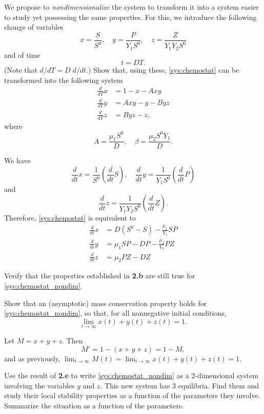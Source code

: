 \documentclass[12pt]{article}
\theoremstyle{plain}
\begin{document}
We propose to \emph{nondimensionalize} the system to transform it into a system easier to study yet possessing the same properties. For this, we introduce the following change of variables
\[
x=\frac{S}{S^0},\quad y=\frac{P}{Y_1S^0},\quad z=\frac{Z}{Y_1Y_2S^0}
\]
and of time
\[
t=DT.
\]
(Note that $d/dT=D\; d/dt$.)
Show that, using these, \eqref{sys:chemostat} can be transformed into the following system
\begin{subequations}\label{sys:chemostat_nondim}
\begin{align}
\frac{d}{dT} x &= 1-x-Axy \label{sys:chemostat_nondim_x} \\
\frac{d}{dT} y &= Axy-y-Byz \label{sys:chemostat_nondim_y} \\
\frac{d}{dT} z &= Byz-z, \label{sys:chemostat_nondim_z}
\end{align}
\end{subequations}
where
\[
A=\frac{\mu_1S^0}{D},\quad \beta=\frac{\mu_2S^0Y_1}{D}.
\]

We have
\[
\frac{d}{dt} x=\frac{1}{S^0}\left(\frac{d}{dt}S\right),\quad
\frac{d}{dt} y=\frac{1}{Y_1S^0}\left(\frac{d}{dt}P\right)
\]
and
\[
\frac{d}{dt} z=\frac{1}{Y_1Y_2S^0}\left(\frac{d}{dt}Z\right).
\]
Therefore, \eqref{sys:chemostat} is equivalent to
\begin{align*}
\frac{d}{dt} x &= D(S^0-S)-\frac{\mu_1}{Y_1}SP \label{sys:chemostat_S} \\
\frac{d}{dt} y &= \mu_1 SP -DP-\frac{\mu_2}{Y_2}PZ \label{sys:chemostat_P} \\
\frac{d}{dt} z &= \mu_2 PZ-DZ \label{sys:chemostat_Z} 
\end{align*}




Verify that the properties established in {\bf 2.b} are still true for \eqref{sys:chemostat_nondim}.


Show that an (asymptotic) mass conservation property holds for \eqref{sys:chemostat_nondim}, so that, for all nonnegative initial conditions,
\[
\lim_{t\to\infty} x(t)+y(t)+z(t)=1.
\]

Let $M=x+y+z$. Then
\[
M'=1-(x+y+z)=1-M,
\]
and as previously, $\lim_{t\to\infty}M(t)=\lim_{t\to\infty} x(t)+y(t)+z(t)=1$.


Use the result of {\bf 2.e} to write \eqref{sys:chemostat_nondim} as a 2-dimensional system involving the variables $y$ and $z$. This new system has 3 equilibria. Find them and study their local stability properties as a function of the parameters they involve. Summarize the situation as a function of the parameters.
\end{document}
